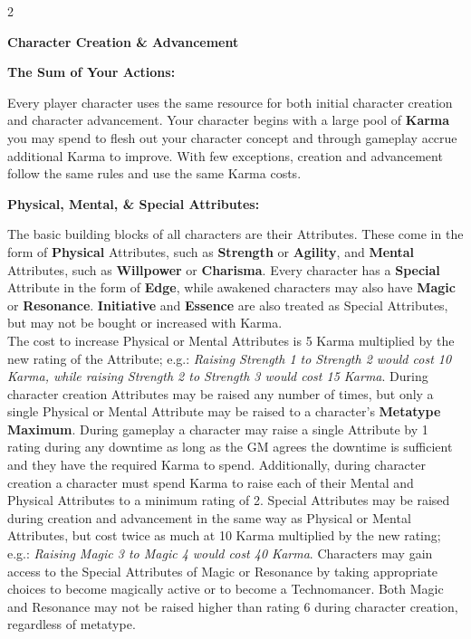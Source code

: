 \documentclass[
  oneside]{article}
\begin{document}
\begin{multicols}{2}

\textbf{Character Creation \& Advancement}

\textbf{The Sum of Your Actions:}

Every player character uses the same resource for
both initial character creation and character
advancement. Your character begins with a large
pool of \textbf{Karma} you may spend to flesh out
your character concept and through gameplay accrue
additional Karma to improve. With few exceptions,
creation and advancement follow the same rules and
use the same Karma costs.

\textbf{Physical, Mental, \& Special Attributes:}

The basic building blocks of all characters are
their Attributes. These come in the form of
\textbf{Physical} Attributes, such as
\textbf{Strength} or \textbf{Agility}, and
\textbf{Mental} Attributes, such as
\textbf{Willpower} or \textbf{Charisma}. Every
character has a \textbf{Special} Attribute in the
form of \textbf{Edge}, while awakened characters
may also have \textbf{Magic} or
\textbf{Resonance}. \textbf{Initiative} and
\textbf{Essence} are also treated as Special
Attributes, but may not be bought or increased
with Karma.\\
The cost to increase Physical or Mental Attributes
is 5 Karma multiplied by the new rating of the
Attribute; e.g.: \emph{Raising Strength 1 to
Strength 2 would cost 10 Karma, while raising
Strength 2 to Strength 3 would cost 15 Karma}.
During character creation Attributes may be raised
any number of times, but only a single Physical or
Mental Attribute may be raised to a character's
\textbf{Metatype Maximum}. During gameplay a
character may raise a single Attribute by 1 rating
during any downtime as long as the GM agrees the
downtime is sufficient and they have the required
Karma to spend. Additionally, during character
creation a character must spend Karma to raise
each of their Mental and Physical Attributes to a
minimum rating of 2. Special Attributes may be
raised during creation and advancement in the same
way as Physical or Mental Attributes, but cost
twice as much at 10 Karma multiplied by the new
rating; e.g.: \emph{Raising Magic 3 to Magic 4
would cost 40 Karma}. Characters may gain access
to the Special Attributes of Magic or Resonance by
taking appropriate choices to become magically
active or to become a Technomancer. Both Magic and
Resonance may not be raised higher than rating 6
during character creation, regardless of metatype.


\end{multicols}
\end{document}
